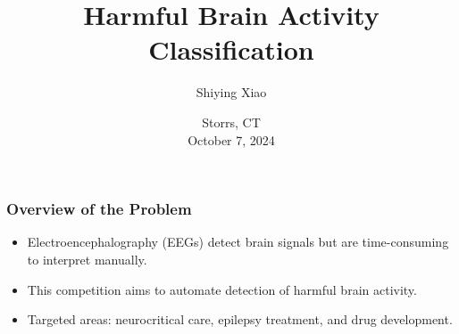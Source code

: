 \documentclass[leqno]{beamer}
\title[\textcolor{black}{HBAC}]{
{\bf \normalsize Harmful Brain Activity Classification}}
\author[Shiying Xiao]{Shiying Xiao}
\institute[UConn]{Department of Statistics, University of Connecticut}
\date[October 7, 2024]{
{\small Storrs, CT} \\
{\small October 7, 2024}}
\begin{document}
\begin{frame}[plain]
\titlepage
\end{frame}








\begin{frame}
\frametitle{Overview of the Problem}
\begin{itemize}
\item Electroencephalography (EEGs) detect brain signals but are time-consuming
to interpret manually.
\bigskip
\item This competition aims to automate detection of harmful brain activity.
\bigskip
\item Targeted areas: neurocritical care, epilepsy treatment, and
drug development.
\end{itemize}
\end{frame}
\end{document}
